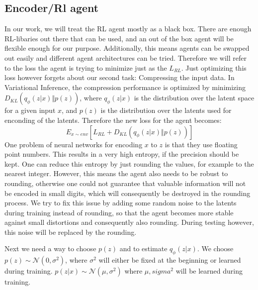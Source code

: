 \documentclass[a4paper]{scrartcl}
\begin{document}
    \subsection{Encoder/Rl agent}
        In our work, we will treat the RL agent mostly as a black box. There are
        enough RL-libaries out there that can be used, and an out of the box
        agent will be flexible enough for our purpose. Additionally, this means
        agents can be swapped out easily and different agent architectures can
        be tried. Therefore we will refer to the loss the agent is trying to
        minimize just as the $L_{RL}$. Just optimizing this loss however
        forgets about our second task: Compressing the input data. In
        Variational Inference, the compression performance is optimized by
        minimizing $D_{KL} (q_\phi (z\vert x) \Vert p(z))$, where $q_\phi
        (z\vert x)$ is the distribution over the latent space for a given input
        $x$, and $p(z)$ is the distribution over the latents used for enconding
        of the latents. Therefore the new loss for the agent becomes:
        \begin{equation}
            E_{x \sim env} [L_{RL} + D_{KL} (q_\phi (z\vert x) \Vert p(z))]
        \end{equation}
        One problem of neural networks for encoding $x$ to $z$ is that they use
        floating point numbers. This results in a very high entropy, if the
        precision should be kept. One can reduce this entropy by just rounding
        the values, for example to the nearest integer. However, this means the
        agent also needs to be robust to rounding, otherwise one could not
        guarantee that valuable information will not be encoded in small digits,
        which will consequently be destroyed in the rounding process. We try to
        fix this issue by adding some random noise to the latents during
        training instead of rounding, so that the agent becomes more stable against small
        distortions and consequently also rounding. During testing however, this
        noise will be replaced by the rounding.
        
        Next we need a way to choose $p(z)$ and to estimate $q_\phi (z\vert x)$.
        We choose $p(z) \sim \mathcal{N}(0, \sigma^2)$, where $\sigma^2$ will
        either be fixed at the beginning or learned during training. $p(z
        \vert x) \sim \mathcal{N}(\mu , \sigma^2)$ where $\mu, sigma^2$ will be
        learned during training.
\end{document}
